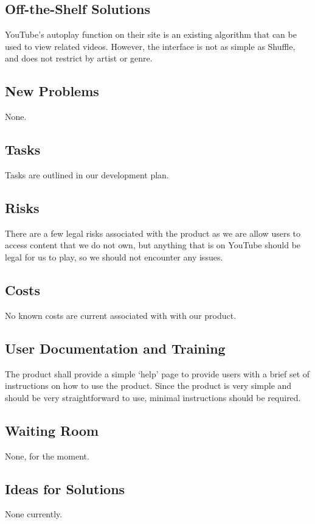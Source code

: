 \documentclass[12pt, titlepage]{article}
\begin{document}
\subsection{Off-the-Shelf Solutions}
YouTube's autoplay function on their site is an existing algorithm that can be used to view related videos.  However, the interface is not as simple as Shuffle, and does not restrict by artist or genre.

\subsection{New Problems}
None.
\subsection{Tasks}
Tasks are outlined in our development plan.
\subsection{Risks}
There are a few legal risks associated with the product as we are allow users to access content that we do not own, but anything that is on YouTube should be legal for us to play, so we should not encounter any issues.

\subsection{Costs}
No known costs are current associated with with our product.

\subsection{User Documentation and Training}
\color{red}
The product shall provide a simple ‘help’ page to provide users with a brief set of instructions on how to use the product.  Since the product is very simple and should be very straightforward to use, minimal instructions should be required.
\color{black}

\subsection{Waiting Room}

None, for the moment.

\subsection{Ideas for Solutions}
None currently.
\end{document}
